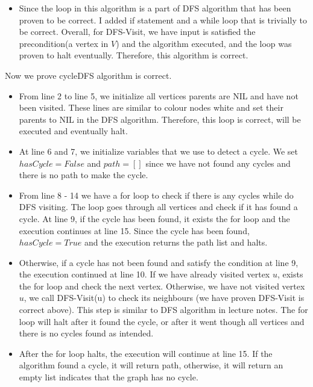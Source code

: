 \documentclass{cpsc413Solutions}
\begin{document}
\begin{problemlist}
\begin{problem}
\begin{answer}
\begin{enumerate}
\begin{itemize}
        \item Since the loop in this algorithm is a part of DFS algorithm that has been proven to be correct. I added if statement and a while loop that is trivially to be correct. Overall, for DFS-Visit, we have input is satisfied the precondition(a vertex in $V$) and the algorithm executed, and the loop was proven to halt eventually. Therefore, this algorithm is correct.
        
    \end{itemize}
    
    Now we prove cycleDFS algorithm is correct.
    \begin{itemize}
        
        \item From line 2 to line 5, we initialize all vertices parents are NIL and have not been visited. These lines are similar to colour nodes white and set their parents to NIL in the DFS algorithm. Therefore, this loop is correct, will be executed and eventually halt.
        
        \item At line 6 and 7, we initialize variables that we use to detect a cycle. We set $hasCycle = False$ and $path = []$ since we have not found any cycles and there is no path to make the cycle. 
        
        \item From line 8 - 14 we have a for loop to check if there is any cycles while do DFS visiting. The loop goes through all vertices and check if it has found a cycle. At line 9, if the cycle has been found, it exists the for loop and the execution continues at line 15. Since the cycle has been found, $hasCycle = True$ and the execution returns the path list and halts.
        
        \item Otherwise, if a cycle has not been found and satisfy the condition at line 9, the execution continued at line 10. If we have already visited vertex $u$, exists the for loop and check the next vertex. Otherwise, we have not visited vertex $u$, we call DFS-Visit(u) to check its neighbours (we have proven DFS-Visit is correct above). This step is similar to DFS algorithm in lecture notes. The for loop will halt after it found the cycle, or after it went though all vertices and there is no cycles found as intended.
        
        \item After the for loop halts, the execution will continue at line 15. If the algorithm found a cycle, it will return path, otherwise, it will return an empty list indicates that the graph has no cycle.
        

\end{itemize}
\end{enumerate}
\end{answer}
\end{problem}
\end{problemlist}
\end{document}
